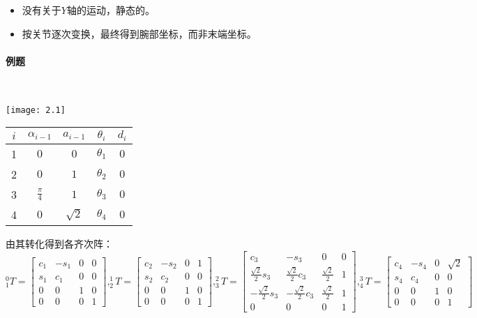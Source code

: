 \documentclass[
12pt, %
a4paper, 
oneside, %
headinclude,footinclude, %
]{scrartcl}
\begin{document}
\begin{itemize}
\item 没有关于$ Y $轴的运动，静态的。
\item 按关节逐次变换，最终得到腕部坐标，而非末端坐标。
\end{itemize} 
\paragraph{例题}\label{sec:example2.1}~\\

\begin{minipage}{0.48\textwidth}
\centering
\texttt{[image: 2.1]}
\end{minipage}
\hfill
\begin{minipage}{0.48\textwidth}
\centering
{}
\begin{tabular}{c|cccc}
\hline
$ i $ & $ \alpha_{i - 1} $ & $ a_{i - 1} $ & $ \theta_i $ & $ d_i $ \\
\hline
1 & $ 0 $ & $ 0 $ & $ \theta_1 $ & $ 0 $ \\
2 & $ 0 $ & $ 1 $ & $ \theta_2 $ & $ 0 $ \\
3 & $ \frac{\pi}{4} $ & $ 1 $ & $ \theta_3 $ & $ 0 $ \\
4 & $ 0 $ & $ \sqrt{2} $ & $ \theta_4 $ & $ 0 $ \\
\hline
\end{tabular}
\end{minipage}

由其转化得到各齐次阵：
{\scriptsize
$$
^0_1T = \begin{bmatrix} c_1 & -s_1 & 0 & 0 \\ s_1 & c_1 & 0 & 0 \\ 0 & 0 & 1 & 0 \\ 0 & 0 & 0 & 1 \end{bmatrix},
^1_2T = \begin{bmatrix} c_2 & -s_2 & 0 & 1 \\ s_2 & c_2 & 0 & 0 \\ 0 & 0 & 1 & 0 \\ 0 & 0 & 0 & 1 \end{bmatrix},
^2_3T = \begin{bmatrix} c_3 & -s_3 & 0 & 0 \\ \frac{\sqrt{2}}{2}s_3 & \frac{\sqrt{2}}{2}c_3 & \frac{\sqrt{2}}{2} & 1 \\ -\frac{\sqrt{2}}{2}s_3 & -\frac{\sqrt{2}}{2}c_3 & \frac{\sqrt{2}}{2} & 1 \\ 0 & 0 & 0 & 1 \end{bmatrix},
^3_4T = \begin{bmatrix} c_4 & -s_4 & 0 & \sqrt{2} \\ s_4 & c_4 & 0 & 0 \\ 0 & 0 & 1 & 0 \\ 0 & 0 & 0 & 1 \end{bmatrix}
$$}
\end{document}
